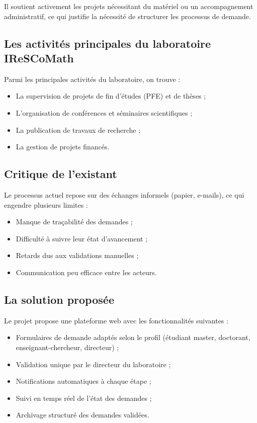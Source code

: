 Il soutient activement les projets nécessitant du matériel ou un accompagnement administratif, ce qui justifie la nécessité de structurer les processus de demande.

\subsection{Les activités principales du laboratoire IReSCoMath}

Parmi les principales activités du laboratoire, on trouve :
\begin{itemize}
  \item La supervision de projets de fin d’études (PFE) et de thèses ;
  \item L’organisation de conférences et séminaires scientifiques ;
  \item La publication de travaux de recherche ;
  \item La gestion de projets financés.
\end{itemize}

\subsection{Critique de l’existant}

Le processus actuel repose sur des échanges informels (papier, e-mails), ce qui engendre plusieurs limites :
\begin{itemize}
  \item Manque de traçabilité des demandes ;
  \item Difficulté à suivre leur état d’avancement ;
  \item Retards dus aux validations manuelles ;
  \item Communication peu efficace entre les acteurs.
\end{itemize}

\subsection{La solution proposée}

Le projet propose une plateforme web avec les fonctionnalités suivantes :
\begin{itemize}
  \item Formulaires de demande adaptés selon le profil (étudiant master, doctorant, enseignant-chercheur, directeur) ;
  \item Validation unique par le directeur du laboratoire ;
  \item Notifications automatiques à chaque étape ;
  \item Suivi en temps réel de l’état des demandes ;
  \item Archivage structuré des demandes validées.
\end{itemize}


